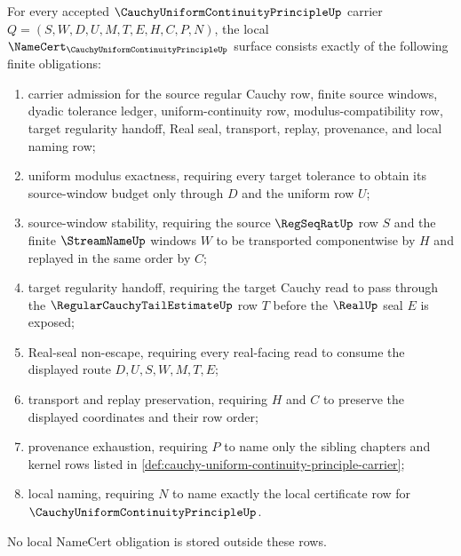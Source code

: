 \begin{theorem}
\label{thm:cauchy-uniform-continuity-principle-namecert-obligations}
For every accepted $\CauchyUniformContinuityPrincipleUp$ carrier $Q=(S,W,D,U,M,T,E,H,C,P,N)$, the local $\NameCert_{\CauchyUniformContinuityPrincipleUp}$ surface consists exactly of the following finite obligations:
\begin{enumerate}
\item carrier admission for the source regular Cauchy row, finite source windows, dyadic tolerance ledger, uniform-continuity row, modulus-compatibility row, target regularity handoff, Real seal, transport, replay, provenance, and local naming row;
\item uniform modulus exactness, requiring every target tolerance to obtain its source-window budget only through $D$ and the uniform row $U$;
\item source-window stability, requiring the source $\RegSeqRatUp$ row $S$ and the finite $\StreamNameUp$ windows $W$ to be transported componentwise by $H$ and replayed in the same order by $C$;
\item target regularity handoff, requiring the target Cauchy read to pass through the $\RegularCauchyTailEstimateUp$ row $T$ before the $\RealUp$ seal $E$ is exposed;
\item Real-seal non-escape, requiring every real-facing read to consume the displayed route $D,U,S,W,M,T,E$;
\item transport and replay preservation, requiring $H$ and $C$ to preserve the displayed coordinates and their row order;
\item provenance exhaustion, requiring $P$ to name only the sibling chapters and kernel rows listed in \autoref{def:cauchy-uniform-continuity-principle-carrier};
\item local naming, requiring $N$ to name exactly the local certificate row for $\CauchyUniformContinuityPrincipleUp$.
\end{enumerate}
No local NameCert obligation is stored outside these rows.
\end{theorem}
